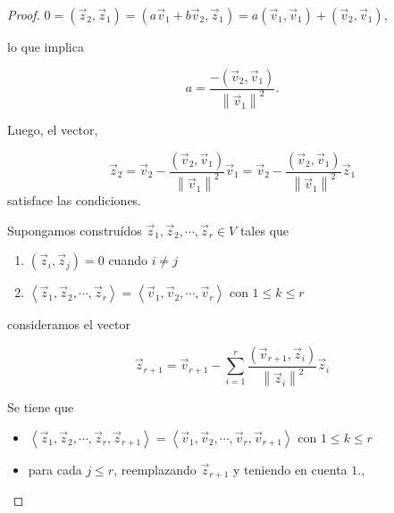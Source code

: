 \begin{theorem}
\begin{proof}
\bigskip



$0=(\vec{z}_2, \vec{z}_1)=(a\vec{v}_1+b\vec{v}_2, \vec{z}_1)= a(\vec{v}_1,\vec{v}_1)+(\vec{v}_2,\vec{v}_1)$,

\noindent 
lo que implica 



$$ a=  \frac {-(\vec{v}_2, \vec{v}_1)} {\left\|\vec{v}_1\right\|^{2}}. $$



Luego, el vector, 

$$ \vec{z}_2= \vec{v}_2 - \frac {(\vec{v}_2, \vec{v}_1)} {\left\|\vec{v}_1\right\|^{2}} \vec{v}_1= \vec{v}_2 - \frac {(\vec{v}_2, \vec{v}_1)} {\left\|\vec{v}_1\right\|^{2}} \vec{z}_1$$
\noindent
satisface las condiciones.

\bigskip


Supongamos construídos $\vec{z}_1, \vec{z}_2,   \cdots, \vec{z}_r \in V$  tales que 

\bigskip

\begin{enumerate}

\bigskip

\item $(\vec z_i,\vec z_j)=0$  cuando $i\neq j$

\bigskip

\item   $\left\langle \vec z_1,\vec z_2, \cdots, \vec z_r \right\rangle=\left\langle \vec v_1,\vec v_2, \cdots, \vec v_r\right\rangle$   con $1\leq k \leq r$


\end{enumerate}
\bigskip

\noindent
consideramos el vector

$$ \vec{z}_{r+1}= \vec{v}_{r+1} -\sum^{r}_{i=1} \frac {(\vec{v}_{r+1}, \vec{z}_i)} {\left\|\vec{z}_i\right\|^{2}} \vec{z}_i$$


\bigskip

Se tiene que 


\bigskip

\begin{itemize}

\item 
$\left\langle \vec{z}_1,\vec{z}_2, \cdots, \vec{z}_r, \vec{z}_{r+1} \right\rangle=\left\langle \vec{v}_1,\vec{v}_2, \cdots, \vec{v}_r,\vec{v}_{r+1}\right\rangle$   con $1\leq k \leq r$

\bigskip

\item  para cada $j\leq r$,  reemplazando $\vec{z}_{r+1}$ y teniendo en cuenta $1.$, 


\end{itemize}
\end{proof}
\end{theorem}
